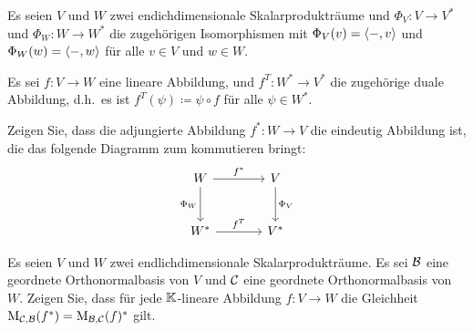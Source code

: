 \documentclass[a4paper, 10pt]{scrartcl}
\begin{document}


\begin{question}
  Es seien $V$ und $W$ zwei endichdimensionale Skalarprodukträume und $\Phi_V \colon V \to V^*$ und $\Phi_W \colon W \to W^*$ die zugehörigen Isomorphismen mit $\Phi_V(v) = \left\langle -,v \right\rangle$ und $\Phi_W(w) = \left\langle -,w \right\rangle$ für alle $v \in V$ und $w \in W$.
  
  Es sei $f \colon V \to W$ eine lineare Abbildung, und $f^T \colon W^* \to V^*$ die zugehörige duale Abbildung, d.h.\ es ist $f^T(\psi) \coloneqq \psi \circ f$ für alle $\psi \in W^*$.
  
  Zeigen Sie, dass die adjungierte Abbildung $f^* \colon W \to V$ die eindeutig Abbildung ist, die das folgende Diagramm zum kommutieren bringt:
  \[
    \begin{tikzcd}[row sep = large, column sep = large, ampersand replacement=\&]
          W
          \arrow{r}{f^*}
          \arrow{d}[left]{\Phi_W}
      \&  V
          \arrow{d}{\Phi_V}
      \\
          W^*
          \arrow{r}{f^T}
      \&  V^*
    \end{tikzcd}
  \]
\end{question}


\begin{question}
  Es seien $V$ und $W$ zwei endlichdimensionale Skalarprodukträume.
  Es sei $\mathcal{B}$ eine geordnete Orthonormalbasis von $V$ und $\mathcal{C}$ eine geordnete Orthonormalbasis von $W$.
  Zeigen Sie, dass für jede $\mathbb{K}$-lineare Abbildung $f \colon V \to W$ die Gleichheit $\mathrm{M}_{\mathcal{C}, \mathcal{B}}(f^*) = \mathrm{M}_{\mathcal{B}, \mathcal{C}}(f)^*$ gilt.
\end{question}



\newpage


\printsolutions
\end{document}
